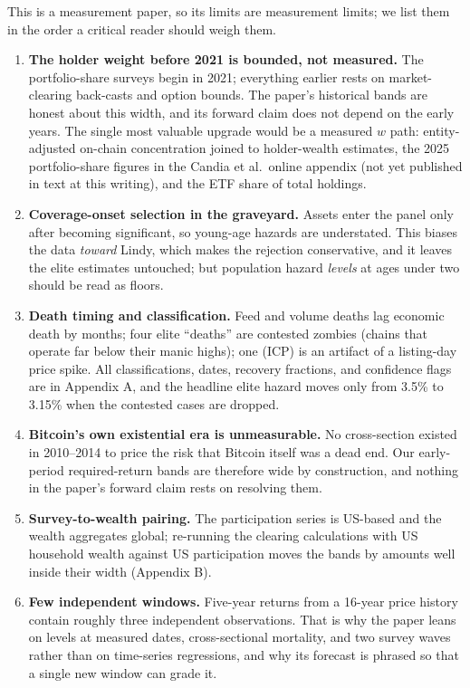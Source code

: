 \documentclass[11pt]{article}
\begin{document}
This is a measurement paper, so its limits are measurement limits; we list them in the order a critical reader should weigh them.
\begin{enumerate}
\item \textbf{The holder weight before 2021 is bounded, not measured.} The portfolio-share surveys begin in 2021; everything earlier rests on market-clearing back-casts and option bounds. The paper's historical bands are honest about this width, and its forward claim does not depend on the early years. The single most valuable upgrade would be a measured $w$ path: entity-adjusted on-chain concentration joined to holder-wealth estimates, the 2025 portfolio-share figures in the Candia et al.\ online appendix (not yet published in text at this writing), and the ETF share of total holdings.
\item \textbf{Coverage-onset selection in the graveyard.} Assets enter the panel only after becoming significant, so young-age hazards are understated. This biases the data \emph{toward} Lindy, which makes the rejection conservative, and it leaves the elite estimates untouched; but population hazard \emph{levels} at ages under two should be read as floors.
\item \textbf{Death timing and classification.} Feed and volume deaths lag economic death by months; four elite ``deaths'' are contested zombies (chains that operate far below their manic highs); one (ICP) is an artifact of a listing-day price spike. All classifications, dates, recovery fractions, and confidence flags are in Appendix A, and the headline elite hazard moves only from 3.5\% to 3.15\% when the contested cases are dropped.
\item \textbf{Bitcoin's own existential era is unmeasurable.} No cross-section existed in 2010--2014 to price the risk that Bitcoin itself was a dead end. Our early-period required-return bands are therefore wide by construction, and nothing in the paper's forward claim rests on resolving them.
\item \textbf{Survey-to-wealth pairing.} The participation series is US-based and the wealth aggregates global; re-running the clearing calculations with US household wealth against US participation moves the bands by amounts well inside their width (Appendix B).
\item \textbf{Few independent windows.} Five-year returns from a 16-year price history contain roughly three independent observations. That is why the paper leans on levels at measured dates, cross-sectional mortality, and two survey waves rather than on time-series regressions, and why its forecast is phrased so that a single new window can grade it.
\end{enumerate}
\end{document}
